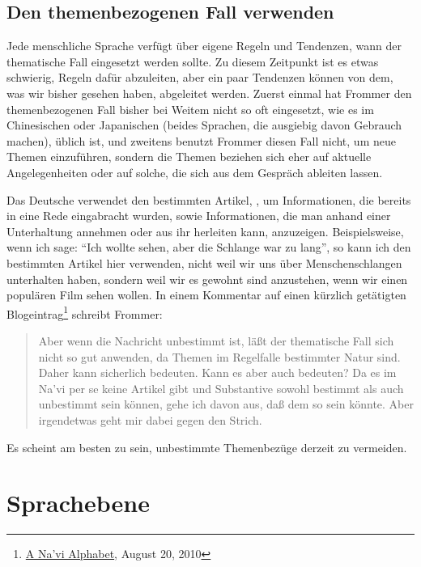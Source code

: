 \subsection{Den themenbezogenen Fall verwenden} Jede menschliche Sprache verf\"ugt
\"uber eigene Regeln und Tendenzen, wann der thematische Fall eingesetzt werden
sollte. Zu diesem Zeitpunkt ist es etwas schwierig, Regeln daf\"ur abzuleiten, aber
ein paar Tendenzen k\"onnen von dem, was wir bisher gesehen haben, abgeleitet
werden. Zuerst einmal hat Frommer den themenbezogenen Fall bisher bei Weitem nicht
so oft eingesetzt, wie es im Chinesischen oder Japanischen (beides Sprachen, die
ausgiebig davon Gebrauch machen), \"ublich ist, und zweitens benutzt Frommer diesen
Fall nicht, um neue Themen einzuf\"uhren, sondern die Themen beziehen sich eher
auf aktuelle Angelegenheiten oder auf solche, die sich aus dem Gespr\"ach ableiten
lassen.

Das Deutsche verwendet den bestimmten Artikel, , um Informationen,
die bereits in eine Rede eingabracht wurden, sowie Informationen, die man anhand
einer Unterhaltung annehmen oder aus ihr herleiten kann, anzuzeigen.
Beispielsweise, wenn ich sage: "`Ich wollte  sehen, aber die Schlange
war zu lang"', so kann ich den bestimmten Artikel hier verwenden, nicht weil wir
uns \"uber Menschenschlangen unterhalten haben, sondern weil wir es gewohnt sind
anzustehen, wenn wir einen popul\"aren Film sehen wollen. In einem Kommentar auf
einen k\"urzlich get\"atigten Blogeintrag\footnote{\href{http://naviteri.org/2010/08/20/}{A
Na'vi Alphabet}, August 20, 2010} schreibt Frommer:

\begin{quote}Aber wenn die Nachricht unbestimmt ist, l\"a\ss{}t der thematische Fall
sich nicht so gut anwenden, da Themen im Regelfalle bestimmter Natur sind. Daher kann
 sicherlich  bedeuten. Kann es aber auch  bedeuten? Da es im Na’vi per se keine Artikel gibt und
Substantive sowohl bestimmt als auch unbestimmt sein k\"onnen, gehe ich davon aus,
da\ss{} dem so sein k\"onnte. Aber irgendetwas geht mir dabei gegen den Strich.
\end{quote}

\noindent Es scheint am besten zu sein, unbestimmte Themenbez\"uge derzeit zu vermeiden.


\section{Sprachebene}

